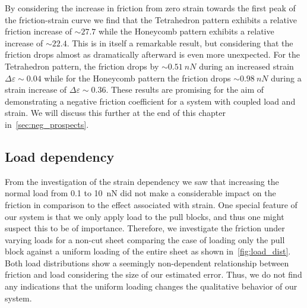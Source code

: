 By considering the increase in friction from zero strain towards the first peak
of the friction-strain curve we find that the Tetrahedron pattern exhibits a
relative friction increase of $\sim 27.7$ while the Honeycomb pattern exhibits a
relative increase of $\sim 22.4$. This is in itself a remarkable result, but
considering that the friction drops almost as dramatically afterward is even more unexpected. For the Tetrahedron pattern, the friction drops by
$\sim \SI{0.51}{nN}$ during an increased strain $\Delta \varepsilon \sim 0.04$
while for the Honeycomb pattern the friction drops $\sim\SI{0.98}{nN}$ during a strain increase of $\Delta \varepsilon \sim 0.36$. These results are promising for the aim of demonstrating a negative friction coefficient for a system with coupled load and strain. We will discuss this further at the end of this chapter in~\cref{sec:neg_prospects}.



\subsection{Load dependency}\label{sec:load_dependency}
From the investigation of the strain dependency we saw that increasing the normal load from 0.1 to \SI{10}{nN} did not make a considerable impact on the friction in comparison to the effect associated with strain. One special feature of our system is that we only apply load to the pull blocks, and thus one might suspect this to be of importance. Therefore, we investigate the friction under varying loads for a non-cut sheet comparing the case of loading only the pull block against a uniform loading of the entire sheet as shown in~\cref{fig:load_dist}. Both load distributions show a seemingly non-dependent relationship between friction and load considering the size of our estimated error. Thus, we do not find any indications that the uniform loading changes the qualitative behavior of our system.

